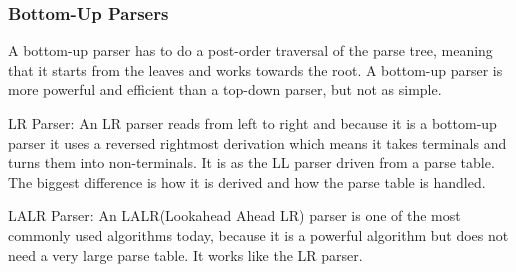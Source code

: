 \subsubsection{Bottom-Up Parsers}
A bottom-up parser has to do a post-order traversal of the parse tree, meaning that it starts from the leaves and works towards the root.
A bottom-up parser is more powerful and efficient than a top-down parser, but not as simple.


\begin{inddes}
	\item[LR Parser:] An LR parser reads from left to right and because it is a bottom-up parser it uses a reversed rightmost derivation which means it takes terminals and turns them into non-terminals. It is as the LL parser driven from a parse table. The biggest difference is how it is derived and how the parse table is handled.  
	\item[LALR Parser:] An LALR(Lookahead Ahead LR) parser is one of the most commonly used algorithms today, because it is a powerful algorithm but does not need a very large parse table. It works like the LR parser.
\end{inddes}

